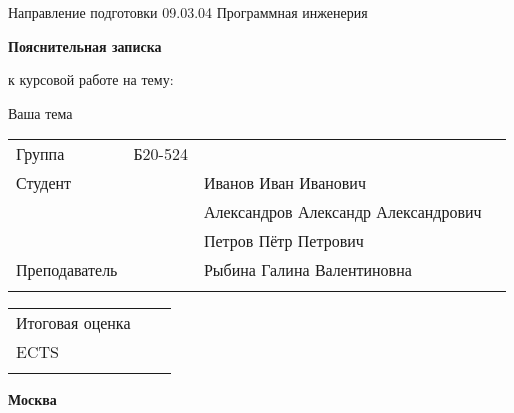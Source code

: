 \thispagestyle{empty}


\vfill

\begin{center}
  Направление подготовки 09.03.04 Программная инженерия

  \vfill

  {\Large{\textbf{Пояснительная записка}}}

  \space к курсовой работе на тему:

  {\Large{Ваша тема}}
\end{center}

\vfill

{\large

\noindent
\begin{tabularx}{\linewidth}{@{}l>{\centering}XlX@{}}
Группа              & \raggedright{Б20-524} &                & \\ 
Студент             &         & Иванов Иван Иванович    & \\ \hhline{~-~}
&         & Александров Александр Александрович    & \\ \hhline{~-~}
&         & Петров Пётр Петрович    & \\ \hhline{~-~}
Преподаватель        &     & Рыбина Галина Валентиновна & \\ \hhline{~-~}
\end{tabularx}

\vfill

\noindent
\begin{tabularx}{\linewidth}{@{}l>{\centering}XX@{}}
Итоговая оценка & & \\ \hhline{~-}
ECTS     &                       & \\ \hhline{~-}
\end{tabularx}

\vfill

\begin{center}
\textbf{Москва \the\year}
\end{center}

}
